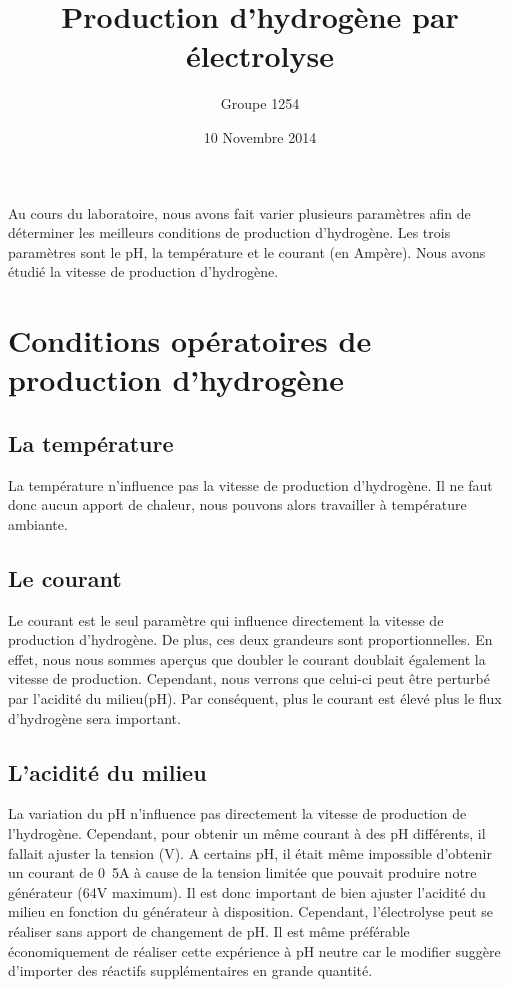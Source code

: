 \documentclass[10pt,a4paper]{article}
\title{Production d'hydrogène par électrolyse}
\author{Groupe 1254}
\date{10 Novembre 2014}
\begin{document}
\maketitle



Au cours du laboratoire, nous avons fait varier plusieurs paramètres afin de déterminer les meilleurs conditions de production d'hydrogène. Les trois paramètres sont le pH, la température et le courant (en Ampère). Nous avons étudié la vitesse de production d'hydrogène.

\section{Conditions opératoires de production d'hydrogène}

\subsection{La température}

La température n'influence pas la vitesse de production d'hydrogène. Il ne faut donc aucun apport de chaleur, nous pouvons alors travailler à température ambiante.



\subsection{Le courant}

Le courant est le seul paramètre qui influence directement la vitesse de production d'hydrogène. De plus, ces deux grandeurs sont proportionnelles. En effet, nous nous sommes aperçus que doubler le courant doublait également la vitesse de production. Cependant, nous verrons que celui-ci peut être perturbé par l'acidité du milieu(pH). Par conséquent, plus le courant est élevé plus le flux d'hydrogène sera important.


\subsection{L'acidité du milieu}

La variation du pH n'influence pas directement la vitesse de production de l'hydrogène. Cependant, pour obtenir un même courant à des pH différents, il fallait ajuster la tension (V). A certains pH, il était même impossible d'obtenir un courant de \unit{0.5}{A} à cause de la tension limitée que pouvait produire notre générateur (\unit{64}{V} maximum). Il est donc important de bien ajuster l'acidité du milieu en fonction du générateur à disposition. Cependant, l'électrolyse peut se réaliser sans apport de changement de pH. Il est même préférable économiquement de réaliser cette expérience à pH neutre car le modifier suggère d'importer des réactifs supplémentaires en grande quantité. 
\end{document}
